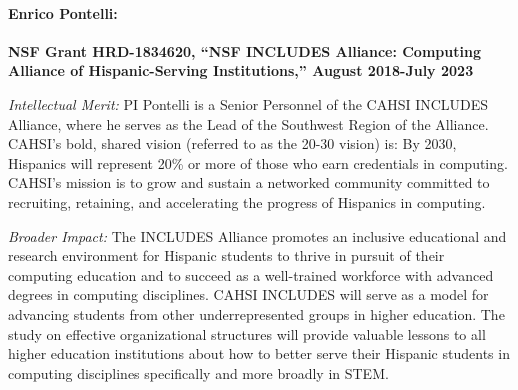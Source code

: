 \paragraph{Enrico Pontelli:}
\textbf{NSF Grant HRD-1834620, ``NSF INCLUDES Alliance: Computing Alliance of Hispanic-Serving Institutions,'' August 2018-July 2023}

\noindent \textit{Intellectual Merit:}
PI Pontelli is a Senior Personnel of the CAHSI INCLUDES Alliance, where he serves as the Lead of the Southwest Region of the Alliance. CAHSI’s bold, shared vision (referred to as the 20-30 vision) is:  By 2030, Hispanics will represent 20\% or more of those who earn credentials in computing. 
CAHSI’s mission is to grow and sustain a networked community committed to recruiting, retaining, and accelerating the progress of Hispanics in computing.


\noindent \textit{Broader Impact:}
The INCLUDES Alliance promotes an inclusive educational and research environment for Hispanic students to thrive in pursuit of their computing education and to succeed as a well-trained workforce with advanced degrees in computing disciplines. 
CAHSI INCLUDES will serve as a model for advancing students from other underrepresented groups in higher education. The study on effective organizational structures will provide valuable lessons to all higher education institutions about how to better serve their Hispanic students in computing disciplines specifically and more broadly in STEM. 

